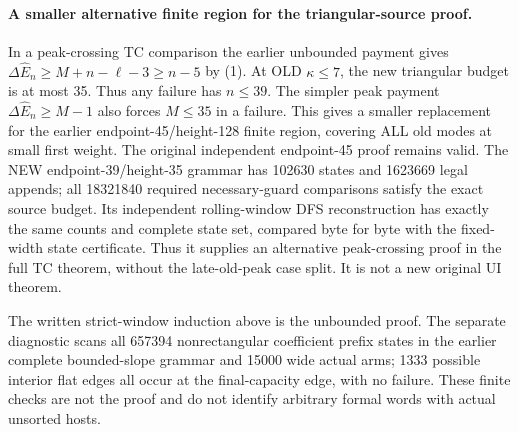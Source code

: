 \paragraph{A smaller alternative finite region for the triangular-source proof.}
In a peak-crossing TC comparison the earlier unbounded payment gives
$\Delta\widehat E_n\ge M+n-\ell-3\ge n-5$ by (1).
At OLD $\kappa\le7$, the new triangular budget is at most 35.
Thus any failure has $n\le39$. The simpler peak payment
$\Delta\widehat E_n\ge M-1$ also forces $M\le35$ in a failure.
This gives a smaller replacement for the earlier endpoint-45/height-128
finite region, covering ALL old modes at small first weight. The original
independent endpoint-45 proof remains valid. The NEW endpoint-39/height-35
grammar has 102630 states and 1623669 legal appends; all 18321840 required
necessary-guard comparisons satisfy the exact source budget. Its independent
rolling-window DFS reconstruction has exactly the same counts and complete
state set, compared byte for byte with the fixed-width state certificate.
Thus it supplies an alternative peak-crossing proof in the full TC theorem,
without the late-old-peak case split. It is not a new original UI theorem.

The written strict-window induction above is the unbounded proof.
The separate diagnostic scans all 657394 nonrectangular coefficient
prefix states in the earlier complete bounded-slope grammar and 15000
wide actual arms; 1333 possible interior flat edges all occur at the
final-capacity edge, with no failure. These finite checks are not the
proof and do not identify arbitrary formal words with actual unsorted hosts.
